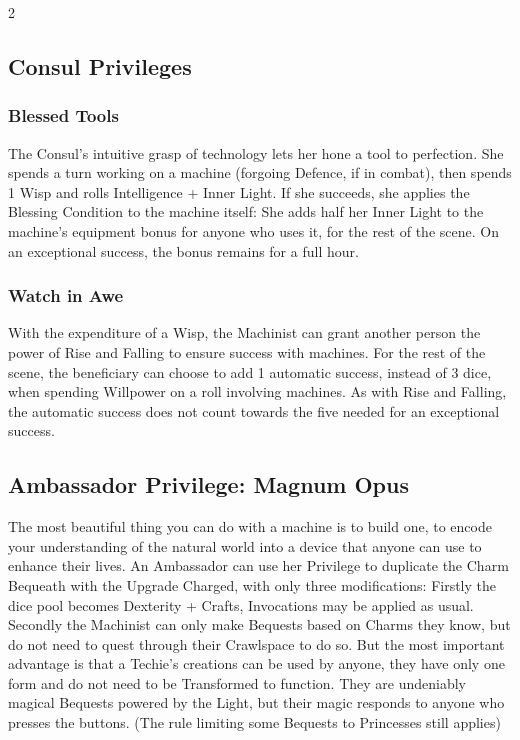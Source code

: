 \begin{multicols}{2}
\subsection*{Consul Privileges}

\subsubsection*{Blessed Tools}
The Consul's intuitive grasp of technology lets her hone a tool to perfection. She spends a turn working on a machine (forgoing Defence, if in combat), then spends 1 Wisp and rolls Intelligence + Inner Light. If she succeeds, she applies the Blessing Condition to the machine itself: She adds half her Inner Light to the machine's equipment bonus for anyone who uses it, for the rest of the scene. On an exceptional success, the bonus remains for a full hour. 
\subsubsection*{Watch in Awe}
With the expenditure of a Wisp, the Machinist can grant another person the power of Rise and Falling to ensure success with machines. For the rest of the scene, the beneficiary can choose to add 1 automatic success, instead of 3 dice, when spending Willpower on a roll involving machines. As with Rise and Falling, the automatic success does not count towards the five needed for an exceptional success. 
\subsection*{Ambassador Privilege: Magnum Opus}

The most beautiful thing you can do with a machine is to build one, to encode your understanding of the natural world into a device that anyone can use to enhance their lives. An Ambassador can use her Privilege to duplicate the Charm Bequeath with the Upgrade Charged, with only three modifications: Firstly the dice pool becomes Dexterity + Crafts, Invocations may be applied as usual. Secondly the Machinist can only make Bequests based on Charms they know, but do not need to quest through their Crawlspace to do so. But the most important advantage is that a Techie's creations can be used by anyone, they have only one form and do not need to be Transformed to function. They are undeniably magical Bequests powered by the Light, but their magic responds to anyone who presses the buttons. (The rule limiting some Bequests to Princesses still applies)


\end{multicols}
